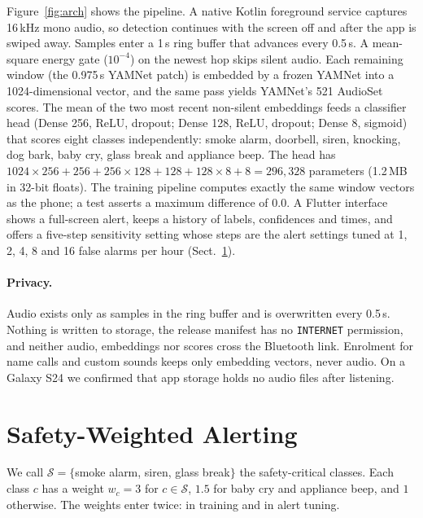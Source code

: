 \documentclass{svproc}
\begin{document}
Figure~\ref{fig:arch} shows the pipeline. A native Kotlin foreground service captures 16\,kHz mono audio, so detection continues with the screen off and after the app is swiped away. Samples enter a 1\,s ring buffer that advances every 0.5\,s. A mean-square energy gate ($10^{-4}$) on the newest hop skips silent audio. Each remaining window (the 0.975\,s YAMNet patch) is embedded by a frozen YAMNet into a 1024-dimensional vector, and the same pass yields YAMNet's 521 AudioSet scores. The mean of the two most recent non-silent embeddings feeds a classifier head (Dense 256, ReLU, dropout; Dense 128, ReLU, dropout; Dense 8, sigmoid) that scores eight classes independently: smoke alarm, doorbell, siren, knocking, dog bark, baby cry, glass break and appliance beep. The head has $1024\times256+256+256\times128+128+128\times8+8 = 296{,}328$ parameters (1.2\,MB in 32-bit floats). The training pipeline computes exactly the same window vectors as the phone; a test asserts a maximum difference of 0.0. A Flutter interface shows a full-screen alert, keeps a history of labels, confidences and times, and offers a five-step sensitivity setting whose steps are the alert settings tuned at 1, 2, 4, 8 and 16 false alarms per hour (Sect.~\ref{sec:asym}).

\paragraph{Privacy.} Audio exists only as samples in the ring buffer and is overwritten every 0.5\,s. Nothing is written to storage, the release manifest has no \texttt{INTERNET} permission, and neither audio, embeddings nor scores cross the Bluetooth link. Enrolment for name calls and custom sounds keeps only embedding vectors, never audio. On a Galaxy S24 we confirmed that app storage holds no audio files after listening.

\section{Safety-Weighted Alerting}\label{sec:asym}
We call $\mathcal{S}=\{$smoke alarm, siren, glass break$\}$ the safety-critical classes. Each class $c$ has a weight $w_c=3$ for $c\in\mathcal{S}$, $1.5$ for baby cry and appliance beep, and $1$ otherwise. The weights enter twice: in training and in alert tuning.
\end{document}

